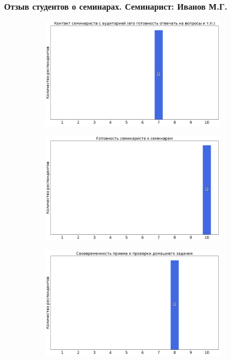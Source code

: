     \subsubsection{Отзыв студентов о семинарах. Семинарист: Иванов М.Г.}
		\begin{figure}[H]
			\centering
			\begin{subfigure}[b]{0.45\textwidth}
				\centering
				\includegraphics[width=\textwidth]{images/4 course/Квантовая механика/seminarists-marks-Иванов М.Г.-0.png}
			\end{subfigure}
			\begin{subfigure}[b]{0.45\textwidth}
				\centering
				\includegraphics[width=\textwidth]{images/4 course/Квантовая механика/seminarists-marks-Иванов М.Г.-1.png}
			\end{subfigure}
			\begin{subfigure}[b]{0.45\textwidth}
				\centering
				\includegraphics[width=\textwidth]{images/4 course/Квантовая механика/seminarists-marks-Иванов М.Г.-2.png}

\end{subfigure}
\end{figure}

